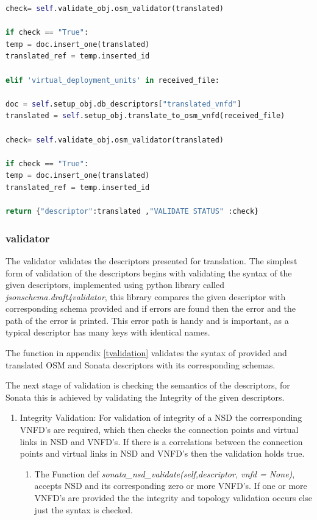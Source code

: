 \begin{lstlisting}[language=Python,caption= Translating descriptor between Pishahang and OSM, label=lis:toSOnata]
check= self.validate_obj.osm_validator(translated)

if check == "True":
temp = doc.insert_one(translated)
translated_ref = temp.inserted_id

elif 'virtual_deployment_units' in received_file:

doc = self.setup_obj.db_descriptors["translated_vnfd"]
translated = self.setup_obj.translate_to_osm_vnfd(received_file)

check= self.validate_obj.osm_validator(translated)

if check == "True":
temp = doc.insert_one(translated)
translated_ref = temp.inserted_id

return {"descriptor":translated ,"VALIDATE STATUS" :check}
\end{lstlisting}

\subsubsection{validator}

The validator validates the descriptors presented for translation. The simplest form of validation of the descriptors begins with validating the syntax of the given descriptors, implemented using python library called \textit{jsonschema.draft4validator}, this library compares the given descriptor with corresponding schema provided and if errors are found then the error and the path of the error is printed. This error path is handy and is important, as a typical descriptor has many keys with identical names.

The function in appendix \ref{tvalidation} validates the syntax of provided and translated OSM and Sonata descriptors with its corresponding schemas.

 The next stage of validation is checking the semantics of the descriptors, for Sonata this is achieved by validating the Integrity of the given descriptors.
 \begin{enumerate}
 	\item Integrity Validation: For validation of integrity of a NSD the corresponding VNFD's are required, which then checks the connection points and virtual links in NSD and VNFD's. If there is a correlations between the connection points and virtual links in NSD and VNFD's then the validation holds true.
 	
 	\begin{enumerate}
 		\item The Function def \textit{sonata\_nsd\_validate(self,descriptor, vnfd = None)}, accepts NSD and its corresponding zero or more VNFD's. If one or more VNFD's are provided the the integrity and topology validation occurs else just the syntax is checked.  
 	\end{enumerate}
 	   
 \end{enumerate}
 

